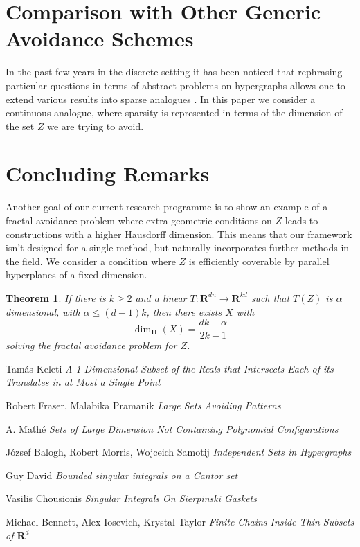 \documentclass{article}
\theoremstyle{plain}
\theoremstyle{plain}
\newtheorem{theorem}{Theorem}
\begin{document}
\begin{multicols}{2}
\section{Comparison with Other Generic Avoidance Schemes}

In the past few years in the discrete setting it has been noticed that rephrasing particular questions in terms of abstract problems on hypergraphs allows one to extend various results into sparse analogues \cite{BaloghMorrisSamotij}. In this paper we consider a continuous analogue, where sparsity is represented in terms of the dimension of the set $Z$ we are trying to avoid.

\section{Concluding Remarks}



Another goal of our current research programme is to show an example of a fractal avoidance problem where extra geometric conditions on $Z$ leads to constructions with a higher Hausdorff dimension. This means that our framework isn't designed for a single method, but naturally incorporates further methods in the field. We consider a condition where $Z$ is efficiently coverable by parallel hyperplanes of a fixed dimension.

\begin{theorem}
	If there is $k \geq 2$ and a linear $T: \mathbf{R}^{dn} \to \mathbf{R}^{kd}$ such that $T(Z)$ is $\alpha$ dimensional, with $\alpha \leq (d-1)k$, then there exists $X$ with
	\[ \dim_{\mathbf{H}}(X) = \frac{dk - \alpha}{2k-1} \]
	solving the fractal avoidance problem for $Z$.
\end{theorem}

\begin{thebibliography}{9}

Tam\'{a}s Keleti
\textit{A 1-Dimensional Subset of the Reals that Intersects Each of its Translates in at Most a Single Point}

Robert Fraser, Malabika Pramanik
\textit{Large Sets Avoiding Patterns}

A. Ma\'{t}h\'{e}
\textit{Sets of Large Dimension Not Containing Polynomial Configurations}

J\'{o}zsef Balogh, Robert Morris, Wojceich Samotij
\textit{Independent Sets in Hypergraphs}

Guy David
\textit{Bounded singular integrals on a Cantor set}

Vasilis Chousionis
\textit{Singular Integrals On Sierpinski Gaskets}

Michael Bennett, Alex Iosevich, Krystal Taylor
\textit{Finite Chains Inside Thin Subsets of $\mathbf{R}^d$}

\end{thebibliography}

\end{multicols}
\end{document}
